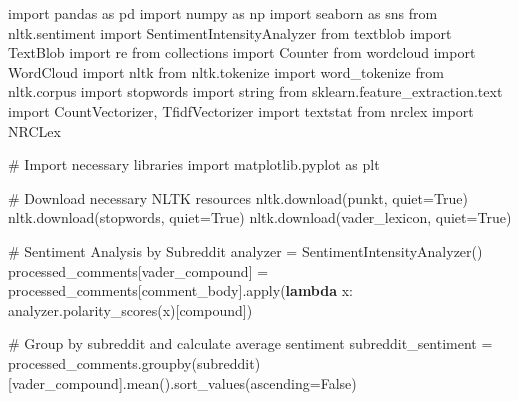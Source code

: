 \documentclass[
  12pt,
  letterpaper,
  DIV=11,
  numbers=noendperiod]{scrartcl}
\newenvironment{Shaded}{\begin{snugshade}}{\end{snugshade}}
\newcommand{\BuiltInTok}[1]{\textcolor[rgb]{0.00,0.23,0.31}{#1}}
\newcommand{\CommentTok}[1]{\textcolor[rgb]{0.37,0.37,0.37}{#1}}
\newcommand{\ImportTok}[1]{\textcolor[rgb]{0.00,0.46,0.62}{#1}}
\newcommand{\KeywordTok}[1]{\textcolor[rgb]{0.00,0.23,0.31}{\textbf{#1}}}
\newcommand{\NormalTok}[1]{\textcolor[rgb]{0.00,0.23,0.31}{#1}}
\newcommand{\OperatorTok}[1]{\textcolor[rgb]{0.37,0.37,0.37}{#1}}
\newcommand{\StringTok}[1]{\textcolor[rgb]{0.13,0.47,0.30}{#1}}
\newcommand{\VariableTok}[1]{\textcolor[rgb]{0.07,0.07,0.07}{#1}}
\begin{document}
\begin{Shaded}
\begin{Highlighting}[]
\ImportTok{import}\NormalTok{ pandas }\ImportTok{as}\NormalTok{ pd}
\ImportTok{import}\NormalTok{ numpy }\ImportTok{as}\NormalTok{ np}
\ImportTok{import}\NormalTok{ seaborn }\ImportTok{as}\NormalTok{ sns}
\ImportTok{from}\NormalTok{ nltk.sentiment }\ImportTok{import}\NormalTok{ SentimentIntensityAnalyzer}
\ImportTok{from}\NormalTok{ textblob }\ImportTok{import}\NormalTok{ TextBlob}
\ImportTok{import}\NormalTok{ re}
\ImportTok{from}\NormalTok{ collections }\ImportTok{import}\NormalTok{ Counter}
\ImportTok{from}\NormalTok{ wordcloud }\ImportTok{import}\NormalTok{ WordCloud}
\ImportTok{import}\NormalTok{ nltk}
\ImportTok{from}\NormalTok{ nltk.tokenize }\ImportTok{import}\NormalTok{ word\_tokenize}
\ImportTok{from}\NormalTok{ nltk.corpus }\ImportTok{import}\NormalTok{ stopwords}
\ImportTok{import}\NormalTok{ string}
\ImportTok{from}\NormalTok{ sklearn.feature\_extraction.text }\ImportTok{import}\NormalTok{ CountVectorizer, TfidfVectorizer}
\ImportTok{import}\NormalTok{ textstat}
\ImportTok{from}\NormalTok{ nrclex }\ImportTok{import}\NormalTok{ NRCLex}

\CommentTok{\# Import necessary libraries}
\ImportTok{import}\NormalTok{ matplotlib.pyplot }\ImportTok{as}\NormalTok{ plt}

\CommentTok{\# Download necessary NLTK resources}
\NormalTok{nltk.download(}\StringTok{\textquotesingle{}punkt\textquotesingle{}}\NormalTok{, quiet}\OperatorTok{=}\VariableTok{True}\NormalTok{)}
\NormalTok{nltk.download(}\StringTok{\textquotesingle{}stopwords\textquotesingle{}}\NormalTok{, quiet}\OperatorTok{=}\VariableTok{True}\NormalTok{)}
\NormalTok{nltk.download(}\StringTok{\textquotesingle{}vader\_lexicon\textquotesingle{}}\NormalTok{, quiet}\OperatorTok{=}\VariableTok{True}\NormalTok{)}

\CommentTok{\# Sentiment Analysis by Subreddit}
\NormalTok{analyzer }\OperatorTok{=}\NormalTok{ SentimentIntensityAnalyzer()}
\NormalTok{processed\_comments[}\StringTok{\textquotesingle{}vader\_compound\textquotesingle{}}\NormalTok{] }\OperatorTok{=}\NormalTok{ processed\_comments[}\StringTok{\textquotesingle{}comment\_body\textquotesingle{}}\NormalTok{].}\BuiltInTok{apply}\NormalTok{(}\KeywordTok{lambda}\NormalTok{ x: analyzer.polarity\_scores(x)[}\StringTok{\textquotesingle{}compound\textquotesingle{}}\NormalTok{])}

\CommentTok{\# Group by subreddit and calculate average sentiment}
\NormalTok{subreddit\_sentiment }\OperatorTok{=}\NormalTok{ processed\_comments.groupby(}\StringTok{\textquotesingle{}subreddit\textquotesingle{}}\NormalTok{)[}\StringTok{\textquotesingle{}vader\_compound\textquotesingle{}}\NormalTok{].mean().sort\_values(ascending}\OperatorTok{=}\VariableTok{False}\NormalTok{)}


\end{Highlighting}
\end{Shaded}
\end{document}
